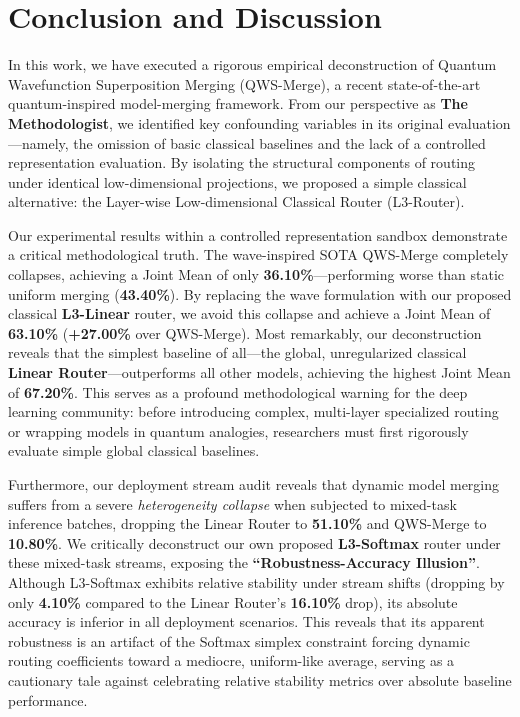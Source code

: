 \section{Conclusion and Discussion}
\label{sec:conclusion}

In this work, we have executed a rigorous empirical deconstruction of Quantum Wavefunction Superposition Merging (QWS-Merge), a recent state-of-the-art quantum-inspired model-merging framework. From our perspective as \textbf{The Methodologist}, we identified key confounding variables in its original evaluation—namely, the omission of basic classical baselines and the lack of a controlled representation evaluation. By isolating the structural components of routing under identical low-dimensional projections, we proposed a simple classical alternative: the Layer-wise Low-dimensional Classical Router (L3-Router).

Our experimental results within a controlled representation sandbox demonstrate a critical methodological truth. The wave-inspired SOTA QWS-Merge completely collapses, achieving a Joint Mean of only \textbf{36.10\%}—performing worse than static uniform merging (\textbf{43.40\%}). By replacing the wave formulation with our proposed classical \textbf{L3-Linear} router, we avoid this collapse and achieve a Joint Mean of \textbf{63.10\%} (\textbf{+27.00\%} over QWS-Merge). Most remarkably, our deconstruction reveals that the simplest baseline of all—the global, unregularized classical \textbf{Linear Router}—outperforms all other models, achieving the highest Joint Mean of \textbf{67.20\%}. This serves as a profound methodological warning for the deep learning community: before introducing complex, multi-layer specialized routing or wrapping models in quantum analogies, researchers must first rigorously evaluate simple global classical baselines.

Furthermore, our deployment stream audit reveals that dynamic model merging suffers from a severe \textit{heterogeneity collapse} when subjected to mixed-task inference batches, dropping the Linear Router to \textbf{51.10\%} and QWS-Merge to \textbf{10.80\%}. We critically deconstruct our own proposed \textbf{L3-Softmax} router under these mixed-task streams, exposing the \textbf{``Robustness-Accuracy Illusion''}. Although L3-Softmax exhibits relative stability under stream shifts (dropping by only \textbf{4.10\%} compared to the Linear Router's \textbf{16.10\%} drop), its absolute accuracy is inferior in all deployment scenarios. This reveals that its apparent robustness is an artifact of the Softmax simplex constraint forcing dynamic routing coefficients toward a mediocre, uniform-like average, serving as a cautionary tale against celebrating relative stability metrics over absolute baseline performance.

